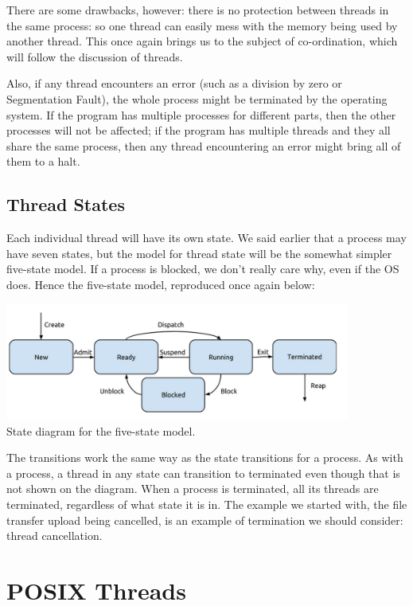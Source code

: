 There are some drawbacks, however: there is no protection between threads in the same process: so one thread can easily mess with the memory being used by another thread. This once again brings us to the subject of co-ordination, which will follow the discussion of threads.

Also, if any thread encounters an error (such as a division by zero or Segmentation Fault), the whole process might be terminated by the operating system. If the program has multiple processes for different parts, then the other processes will not be affected; if the program has multiple threads and they all share the same process, then any thread encountering an error might bring all of them to a halt.


\subsection*{Thread States}
Each individual thread will have its own state. We said earlier that a process may have seven states, but the model for thread state will be the somewhat simpler five-state model. If a process is blocked, we don't really care why, even if the OS does. Hence the five-state model, reproduced once again below:

\begin{center}
	\includegraphics[width=0.85\textwidth]{images/5-state-model.png}\\
	State diagram for the five-state model.
\end{center}

The transitions work the same way as the state transitions for a process. As with a process, a thread in any state can transition to terminated even though that is not shown on the diagram. When a process is terminated, all its threads are terminated, regardless of what state it is in. The example we started with, the file transfer upload being cancelled, is an example of termination we should consider: thread cancellation.


\section*{POSIX Threads}


